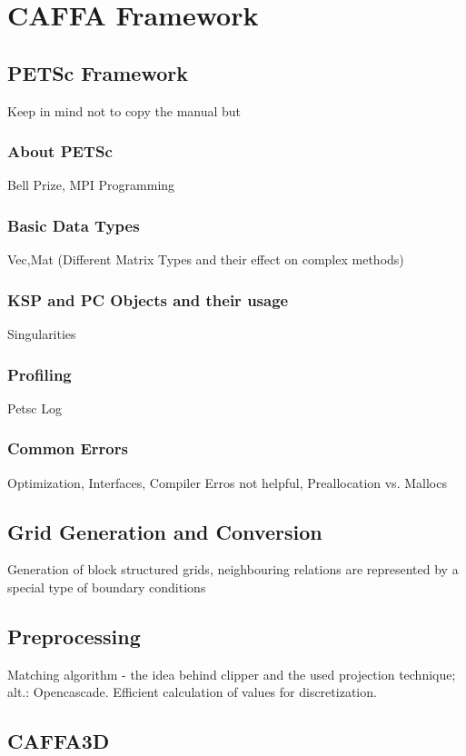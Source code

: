 \documentclass[article,type=msc,colorback,accentcolor=tud2a]{tudthesis}
\begin{document}
  \section{CAFFA Framework}

    \subsection{PETSc Framework}
      Keep in mind not to copy the manual but
      \subsubsection{About PETSc}
        Bell Prize, MPI Programming
      \subsubsection{Basic Data Types}
        Vec,Mat (Different Matrix Types and their effect on complex methods)
      \subsubsection{KSP and PC Objects and their usage}
        Singularities
      \subsubsection{Profiling}
        Petsc Log 
      \subsubsection{Common Errors}
        Optimization, Interfaces, Compiler Erros not helpful, Preallocation vs. Mallocs

    \subsection{Grid Generation and Conversion}
    Generation of block structured grids, neighbouring relations are represented by a special type of boundary conditions
    \subsection{Preprocessing}
    Matching algorithm - the idea behind clipper and the used projection technique; alt.: Opencascade. Efficient calculation of values for discretization.
    \subsection{CAFFA3D}
\end{document}
